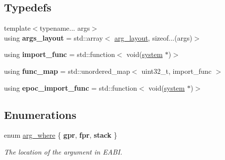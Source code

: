 \subsection*{Typedefs}
\begin{DoxyCompactItemize}
\item 
\mbox{\label{namespaceeka2l1_1_1hle_ac5c18795c4eb73b642308964bfe773dd}} 
{\footnotesize template$<$typename... args$>$ }\\using {\bfseries args\+\_\+layout} = std\+::array$<$ \mbox{\hyperlink{structeka2l1_1_1hle_1_1arg__layout}{arg\+\_\+layout}}, sizeof...(args)$>$
\item 
\mbox{\label{namespaceeka2l1_1_1hle_afd78e8dda0e1cfe5871165e658f14b8e}} 
using {\bfseries import\+\_\+func} = std\+::function$<$ void(\mbox{\hyperlink{classeka2l1_1_1system}{system}} $\ast$)$>$
\item 
\mbox{\label{namespaceeka2l1_1_1hle_ae5bf6e9df6f6c67080b951f166aa4eae}} 
using {\bfseries func\+\_\+map} = std\+::unordered\+\_\+map$<$ uint32\+\_\+t, import\+\_\+func $>$
\item 
\mbox{\label{namespaceeka2l1_1_1hle_a2bef3a6f353264dce61f6d6a981f424d}} 
using {\bfseries epoc\+\_\+import\+\_\+func} = std\+::function$<$ void(\mbox{\hyperlink{classeka2l1_1_1system}{system}} $\ast$)$>$
\end{DoxyCompactItemize}
\subsection*{Enumerations}
\begin{DoxyCompactItemize}
\item 
\mbox{\label{namespaceeka2l1_1_1hle_a4b57225b8d2741a5b0e9c0a5a594efb4}} 
enum \mbox{\hyperlink{namespaceeka2l1_1_1hle_a4b57225b8d2741a5b0e9c0a5a594efb4}{arg\+\_\+where}} \{ {\bfseries gpr}, 
{\bfseries fpr}, 
{\bfseries stack}
 \}
\begin{DoxyCompactList}\small\item\em The location of the argument in E\+A\+BI. \end{DoxyCompactList}\end{DoxyCompactItemize}
